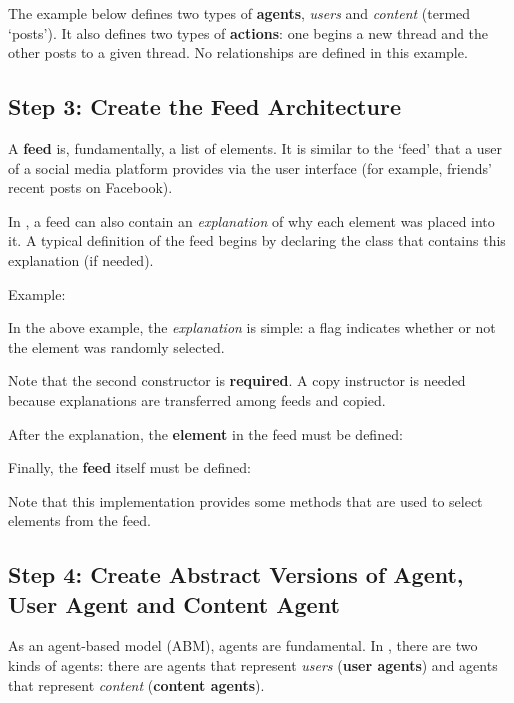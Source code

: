 The example below defines two types of \textbf{agents}, \textit{users} and \textit{content }(termed `posts'). It also defines two types of \textbf{actions}: one begins a new thread and the other posts to a given thread. No relationships are defined in this example. 


	
\subsection{Step 3: Create the Feed Architecture}
A \textbf{feed} is, fundamentally, a list of elements. It is similar to the `feed' that a user of a social media platform provides via the user interface (for example, friends' recent posts on Facebook). 

In \rhpc, a feed can also contain an \textit{explanation} of why each element was placed into it.  A typical definition of the feed begins by declaring the class that contains this explanation (if needed). 

Example:


In the above example, the \textit{explanation} is simple: a flag indicates whether or not the element was randomly selected.

Note that the second constructor is \textbf{required}. A copy instructor is needed because explanations are transferred among feeds and copied.

After the explanation, the \textbf{element} in the feed must be defined:



Finally, the \textbf{feed} itself must be defined:



Note that this implementation provides some methods that are used to select elements from the feed.

\subsection{Step 4: Create Abstract Versions of Agent, User Agent and Content Agent}
As an agent-based model (ABM), agents are fundamental. In \rhpc, there are two kinds of agents: there are agents that represent \emph{users} (\textbf{user agents}) and agents that represent \emph{content} (\textbf{content agents}).


